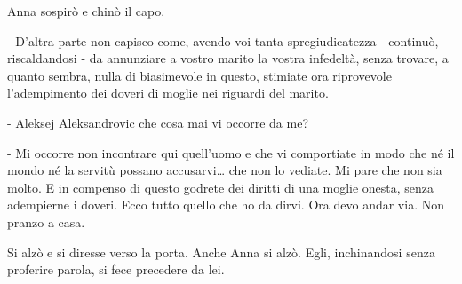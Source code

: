 Anna sospirò e chinò il capo. 

- D'altra parte non capisco come, avendo voi tanta spregiudicatezza - continuò, riscaldandosi - da annunziare a vostro marito la vostra infedeltà, senza trovare, a quanto sembra, nulla di biasimevole in questo, stimiate ora riprovevole l'adempimento dei doveri di moglie nei riguardi del marito. 

- Aleksej Aleksandrovic che cosa mai vi occorre da me? 

- Mi occorre non incontrare qui quell'uomo e che vi comportiate in modo che né il mondo né la servitù possano accusarvi\ldots{} che non lo vediate. Mi pare che non sia molto. E in compenso di questo godrete dei diritti di una moglie onesta, senza adempierne i doveri. Ecco tutto quello che ho da dirvi. Ora devo andar via. Non pranzo a casa. 

Si alzò e si diresse verso la porta. Anche Anna si alzò. Egli, inchinandosi senza proferire parola, si fece precedere da lei. 

\label{xxiv-2} 

